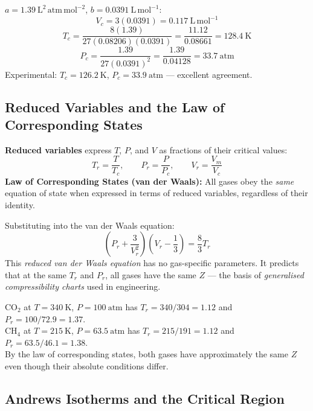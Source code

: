 \documentclass[12pt,a4paper]{article}
\begin{document}
\begin{tcolorbox}[examplebox, title={Solved Example: Critical Constants of \texorpdfstring{$\mathrm{N_2}$}{N2}}]
$a=1.39\ \mathrm{L^2\,atm\,mol^{-2}}$, $b=0.0391\ \mathrm{L\,mol^{-1}}$:
\[
V_c = 3(0.0391) = 0.117\ \mathrm{L\,mol^{-1}}
\]
\[
T_c = \frac{8(1.39)}{27(0.08206)(0.0391)} = \frac{11.12}{0.08661} = 128.4\ \mathrm{K}
\]
\[
P_c = \frac{1.39}{27(0.0391)^2} = \frac{1.39}{0.04128} = 33.7\ \mathrm{atm}
\]
Experimental: $T_c=126.2\ \mathrm{K}$, $P_c=33.9\ \mathrm{atm}$ --- excellent agreement.
\end{tcolorbox}

\subsection{Reduced Variables and the Law of Corresponding States}

\begin{tcolorbox}[defbox]
\textbf{Reduced variables} express $T$, $P$, and $V$ as fractions of their critical values:
\[
T_r = \frac{T}{T_c}, \qquad P_r = \frac{P}{P_c}, \qquad V_r = \frac{V_m}{V_c}
\]
\textbf{Law of Corresponding States (van der Waals):} All gases obey the \emph{same} equation of state when expressed in terms of reduced variables, regardless of their identity.
\end{tcolorbox}

Substituting into the van der Waals equation:
\[
\left(P_r + \frac{3}{V_r^2}\right)\!\left(V_r - \frac{1}{3}\right) = \frac{8}{3}T_r
\]
This \emph{reduced van der Waals equation} has no gas-specific parameters. It predicts that at the same $T_r$ and $P_r$, all gases have the same $Z$ --- the basis of \emph{generalised compressibility charts} used in engineering.

\begin{tcolorbox}[examplebox, title={Application: Comparing States of Different Gases}]
$\mathrm{CO_2}$ at $T=340\ \mathrm{K}$, $P=100\ \mathrm{atm}$ has $T_r=340/304=1.12$ and $P_r=100/72.9=1.37$.\\
$\mathrm{CH_4}$ at $T=215\ \mathrm{K}$, $P=63.5\ \mathrm{atm}$ has $T_r=215/191=1.12$ and $P_r=63.5/46.1=1.38$.\\
By the law of corresponding states, both gases have approximately the same $Z$ even though their absolute conditions differ.
\end{tcolorbox}

\subsection{Andrews Isotherms and the Critical Region}
\end{document}
